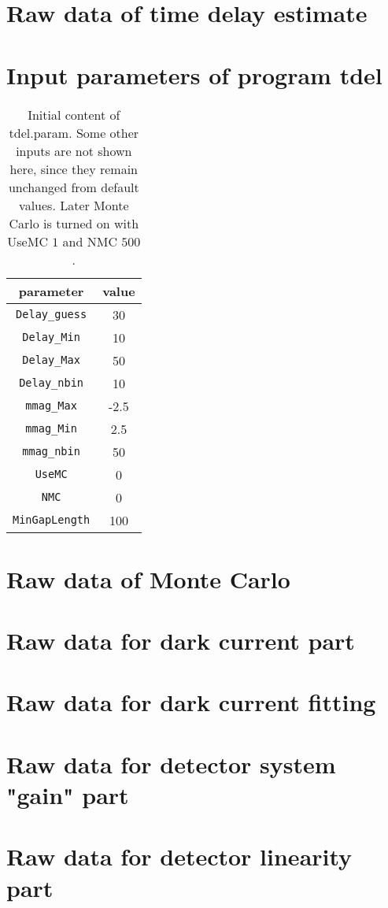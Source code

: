 \clearpage
\section{Raw data of time delay estimate}\label{app:timdel}


\clearpage
\section{Input parameters of program tdel}
\begin{table}[ht]
	\centering
	\begin{tabular}{cc}
		\toprule
		parameter & value \\	
		\midrule
		\verb|Delay_guess| & 30 \\
		\verb|Delay_Min| & 10 \\
		\verb|Delay_Max| & 50 \\
		\verb|Delay_nbin| & 10 \\
		\verb|mmag_Max| & -2.5 \\
		\verb|mmag_Min| & 2.5 \\
		\verb|mmag_nbin| & 50 \\
		\verb|UseMC| &	0 \\
		\verb|NMC| & 0\\
		\verb|MinGapLength| & 100\\
		\bottomrule
	\end{tabular} 
	\caption{Initial content of tdel.param. Some other inputs are not shown here, since they remain unchanged from default values. Later Monte Carlo is turned on with UseMC $1$ and NMC $500$.}
	\label{tab:tdelInParam}
\end{table}

\clearpage
\section{Raw data of Monte Carlo}\label{app:MCout}


\clearpage
\section{Raw data for dark current part}\label{app:darkCurrent}


\clearpage
\section{Raw data for dark current fitting}\label{app:DCfit}


\section{Raw data for detector system "gain" part}\label{app:gain}


\clearpage
\section{Raw data for detector linearity part}\label{app:detLinear}


